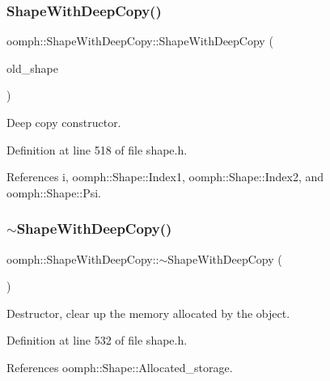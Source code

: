 \subsubsection{\texorpdfstring{Shape\+With\+Deep\+Copy()}{ShapeWithDeepCopy()}\hspace{0.1cm}{\footnotesize\ttfamily [4/4]}}
{\footnotesize\ttfamily oomph\+::\+Shape\+With\+Deep\+Copy\+::\+Shape\+With\+Deep\+Copy (\begin{DoxyParamCaption}\item[{const \hyperlink{classoomph_1_1ShapeWithDeepCopy}{Shape\+With\+Deep\+Copy} \&}]{old\+\_\+shape }\end{DoxyParamCaption})\hspace{0.3cm}{\ttfamily [inline]}}



Deep copy constructor. 



Definition at line 518 of file shape.\+h.



References i, oomph\+::\+Shape\+::\+Index1, oomph\+::\+Shape\+::\+Index2, and oomph\+::\+Shape\+::\+Psi.

\mbox{\label{classoomph_1_1ShapeWithDeepCopy_a6b263cf21ce417463668486e81ec3d60}} 
\subsubsection{\texorpdfstring{$\sim$\+Shape\+With\+Deep\+Copy()}{~ShapeWithDeepCopy()}}
{\footnotesize\ttfamily oomph\+::\+Shape\+With\+Deep\+Copy\+::$\sim$\+Shape\+With\+Deep\+Copy (\begin{DoxyParamCaption}{ }\end{DoxyParamCaption})\hspace{0.3cm}{\ttfamily [inline]}}



Destructor, clear up the memory allocated by the object. 



Definition at line 532 of file shape.\+h.



References oomph\+::\+Shape\+::\+Allocated\+\_\+storage.



